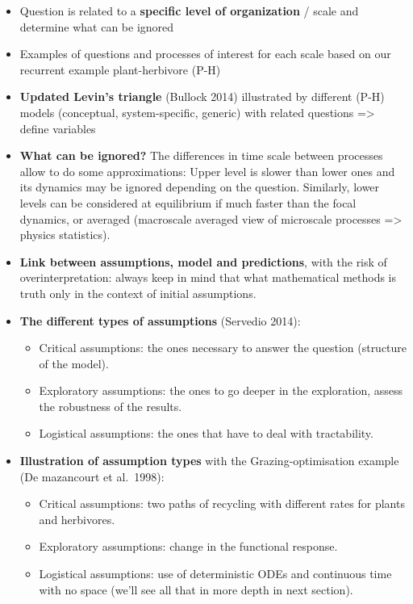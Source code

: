 \documentclass[
]{book}
\providecommand{\tightlist}{%
  \setlength{\itemsep}{0pt}\setlength{\parskip}{0pt}}
\theoremstyle{definition}
\theoremstyle{definition}
\theoremstyle{definition}
\theoremstyle{definition}
\theoremstyle{remark}
\begin{document}
\begin{itemize}
\tightlist
\item
  Question is related to a \textbf{specific level of organization} / scale and determine what can be ignored
\item
  Examples of questions and processes of interest for each scale based on our recurrent example plant-herbivore (P-H)
\item
  \textbf{Updated Levin's triangle} (Bullock 2014) illustrated by different (P-H) models (conceptual, system-specific, generic) with related questions =\textgreater{} define variables
\item
  \textbf{What can be ignored?} The differences in time scale between processes allow to do some approximations: Upper level is slower than lower ones and its dynamics may be ignored depending on the question. Similarly, lower levels can be considered at equilibrium if much faster than the focal dynamics, or averaged (macroscale averaged view of microscale processes =\textgreater{} physics statistics).
\item
  \textbf{Link between assumptions, model and predictions}, with the risk of overinterpretation: always keep in mind that what mathematical methods is truth only in the context of initial assumptions.
\item
  \textbf{The different types of assumptions} (Servedio 2014):

  \begin{itemize}
  \tightlist
  \item
    Critical assumptions: the ones necessary to answer the question (structure of the model).
  \item
    Exploratory assumptions: the ones to go deeper in the exploration, assess the robustness of the results.
  \item
    Logistical assumptions: the ones that have to deal with tractability.
  \end{itemize}
\item
  \textbf{Illustration of assumption types} with the Grazing-optimisation example (De mazancourt et al.~1998):

  \begin{itemize}
  \tightlist
  \item
    Critical assumptions: two paths of recycling with different rates for plants and herbivores.
  \item
    Exploratory assumptions: change in the functional response.
  \item
    Logistical assumptions: use of deterministic ODEs and continuous time with no space (we'll see all that in more depth in next section).
  \end{itemize}
\end{itemize}
\end{document}
